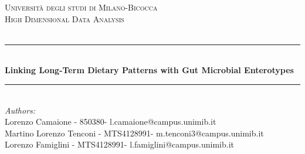 \begin{titlepage}

\newcommand{\HRule}{\rule{\linewidth}{0.5mm}} %

\center %
 

\textsc{\LARGE Università degli studi di Milano-Bicocca}\\[1cm] %
\textsc{\Large High Dimensional Data Analysis}\\[0.3cm] %
\textsc{\large }\\[0.1cm] %


\HRule \\[0.4cm]
{ \huge \bfseries Linking Long-Term Dietary Patterns with Gut Microbial Enterotypes}\\[0.4cm] %
\HRule \\[1.5cm]
 

\large
\emph{Authors:}\\
Lorenzo Camaione - 850380- l.camaione@campus.unimib.it \\   %
Martino Lorenzo Tenconi - MTS4128991- m.tenconi3@campus.unimib.it \\  %
Lorenzo Famiglini - MTS4128991- l.famiglini@campus.unimib.it   \\[1cm] %




\end{titlepage}
